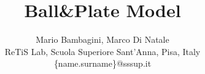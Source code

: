 \documentclass[a4paper,11pt]{article}
\begin{document}
%
\title{Ball\&Plate Model}

\author{Mario Bambagini, Marco Di Natale\\
ReTiS Lab, Scuola Superiore Sant'Anna, Pisa, Italy\\
\{name.surname\}@sssup.it}




\maketitle

















\end{document}
